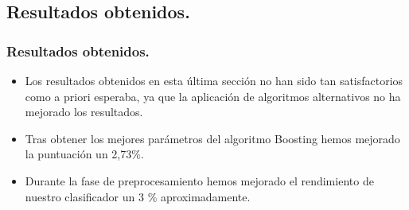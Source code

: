 \documentclass{beamer}
\theoremstyle{plain}
\theoremstyle{definition}
\theoremstyle{plain}
\theoremstyle{definition}
\theoremstyle{remark}
\theoremstyle{definition}
\begin{document}
\subsection{Resultados obtenidos.}
\begin{frame}
	\tableofcontents[currentsection,currentsubsection,sections=2]
\end{frame}
\begin{frame}
	\frametitle{Resultados obtenidos.}
	\begin{itemize}
		\item Los resultados obtenidos en esta última sección no han sido tan satisfactorios como a priori esperaba, ya que la aplicación de algoritmos alternativos no ha mejorado los resultados.
		\item Tras obtener los mejores parámetros del algoritmo Boosting hemos mejorado la puntuación un 2,73\%.
		\item Durante la fase de preprocesamiento hemos mejorado el rendimiento de nuestro clasificador un 3 \% aproximadamente.
	   
	\end{itemize}
\end{frame}
\end{document}
